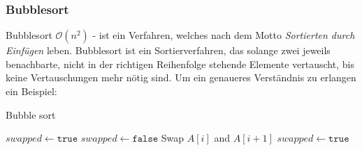 \documentclass[a4paper]{article}
\begin{document}
    \subsubsection{Bubblesort}\label{Bubblesort}
    Bubblesort $\mathcal{O}(n^2)$ - ist ein Verfahren, welches nach dem Motto \textit{Sortierten durch Einfügen} leben. Bubblesort ist ein Sortierverfahren, das solange zwei jeweils
    benachbarte, nicht in der richtigen Reihenfolge stehende Elemente vertauscht, bis keine Vertauschungen mehr nötig sind.
    Um ein genaueres Verständnis zu erlangen ein Beispiel: \\
    
\begin{algorithm}
    \caption{Bubble sort}
    \label{alg:BubbleSort}
    \begin{algorithmic} 
        \State $swapped \gets \texttt{true}$
        \State $swapped \gets \texttt{false}$
        \State Swap $A\left[i\right]$ and $A\left[i+1\right]$
        \State $swapped \gets \texttt{true}$
        \EndIf
        \EndFor
        \EndWhile
    \end{algorithmic}
\end{algorithm}
\end{document}
